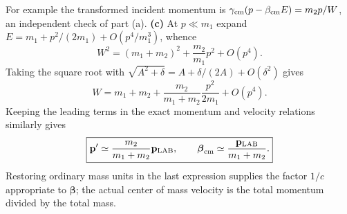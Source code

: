 For example the transformed incident momentum is
$\gamma_{\rm cm}(p-\beta_{\rm cm}E)=m_2p/W$,
an independent check of part (a).
\textbf{(c)} At $p\ll m_1$ expand
$E=m_1+p^2/(2m_1)+O(p^4/m_1^3)$, whence
\[
W^2=(m_1+m_2)^2+\frac{m_2}{m_1}p^2+O(p^4).
\]
Taking the square root with
$\sqrt{A^2+\delta}=A+\delta/(2A)+O(\delta^2)$ gives
\[
\boxed{W=m_1+m_2+\frac{m_2}{m_1+m_2}\frac{p^2}{2m_1}+O(p^4).}
\]
Keeping the leading terms in the exact momentum and velocity
relations similarly gives
\[
\boxed{\mathbf p'\simeq\frac{m_2}{m_1+m_2}\mathbf p_{\rm LAB},
\qquad \boldsymbol\beta_{\rm cm}\simeq
\frac{\mathbf p_{\rm LAB}}{m_1+m_2}.}
\]
Restoring ordinary mass units in the last expression supplies the
factor $1/c$ appropriate to $\boldsymbol\beta$; the actual center
of mass velocity is the total momentum divided by the total mass.

